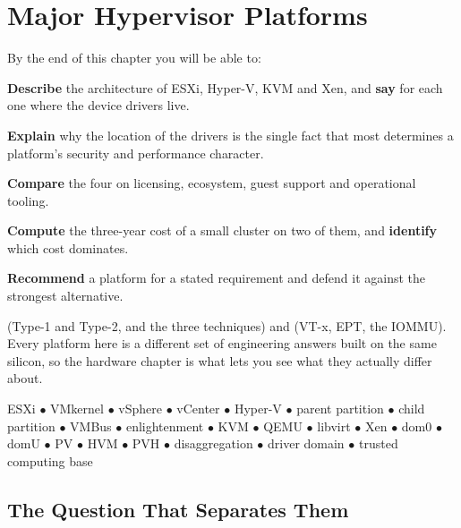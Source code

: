\chapter{Major Hypervisor Platforms}\label{ch:platforms}

\begin{outcomes}
By the end of this chapter you will be able to:
\begin{tight}
  \item \textbf{Describe} the architecture of ESXi, Hyper-V, KVM and Xen, and
        \textbf{say} for each one where the device drivers live.
  \item \textbf{Explain} why the location of the drivers is the single fact
        that most determines a platform's security and performance character.
  \item \textbf{Compare} the four on licensing, ecosystem, guest support and
        operational tooling.
  \item \textbf{Compute} the three-year cost of a small cluster on two of them,
        and \textbf{identify} which cost dominates.
  \item \textbf{Recommend} a platform for a stated requirement and defend it
        against the strongest alternative.
\end{tight}
\end{outcomes}

\begin{prereq}
 (Type-1 and Type-2, and the three techniques) and
 (VT-x, EPT, the IOMMU). Every platform here is a different set
of engineering answers built on the same silicon, so the hardware chapter is
what lets you see what they actually differ about.
\end{prereq}

\begin{keyterms}
ESXi $\bullet$ VMkernel $\bullet$ vSphere $\bullet$ vCenter $\bullet$ Hyper-V
$\bullet$ parent partition $\bullet$ child partition $\bullet$ VMBus $\bullet$
enlightenment $\bullet$ KVM $\bullet$ QEMU $\bullet$ libvirt $\bullet$ Xen
$\bullet$ dom0 $\bullet$ domU $\bullet$ PV $\bullet$ HVM $\bullet$ PVH
$\bullet$ disaggregation $\bullet$ driver domain $\bullet$ trusted computing
base
\end{keyterms}

\section{The Question That Separates Them}

